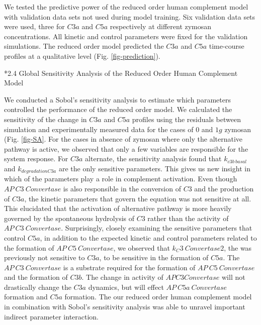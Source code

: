 \documentclass[12pt]{article}
\makeatletter
\renewcommand\subsection{\@startsection
	{subsection}{2}{0mm}
	{-0.05in}
	{-0.5\baselineskip}
	{\normalfont\normalsize\bfseries}}
\makeatother
\begin{document}
We tested the predictive power of the reduced order human complement model with validation data sets not used during model training. Six validation data sets were used, three for $C3a$ and $C5a$ respectively at different zymosan concentrations. All kinetic and control parameters were
fixed for the validation simulations. The reduced order model predicted the $C3a$ and $C5a$ time-course profiles at a qualitative level (Fig. \ref{fig-prediction}).

\subsection*{2.4 Global Sensitivity Analysis of the Reduced Order Human Complement Model}

We conducted a Sobol's sensitivity analysis to estimate which parameters controlled the performance of the reduced order model. We calculated the sensitivity of the change in $C3a$ and $C5a$ profiles using the residuals between simulation and experimentally measured data for the cases of $0$ and $1 g$ zymosan (Fig. \ref{fig-SA}. For the cases in absence of zymosan where only the alternative pathway is active, we observed that only a few variables are responsible for the system response. For $C3a$ alternate, the sensitivity analysis found that $k_{c3b~basal}$ and $k_{degradationC3a}$ are the only sensitive parameters. This gives us new insight in which of the parameters play a role in complement activation. Even though $AP~C3~Convertase$ is also responsible in the conversion of $C3$ and the production of $C3a$, the kinetic parameters that govern the equation was not sensitive at all. This elucidated that the activation of alternative pathway is more heavily governed by the spontaneous hydrolysis of $C3$ rather than the activity of $AP~C3~Convertase$. Surprisingly, closely examining the sensitive parameters that control $C5a$, in addition to the expected kinetic and control parameters related to the formation of $AP~C5~Convertase$, we observed that $k_C3~Convertase2$, the was previously not sensitive to $C3a$, to be sensitive in the formation of $C5a$. The $AP~C3~Convertase$ is a substrate required for the formation of $AP~C5~Convertase$ and the formation of $C3b$. The change in activity of $AP C3 Convertase$  will not drastically change the $C3a$ dynamics, but will effect $AP~C5a~Convertase$ formation and $C5a$ formation. The our reduced order human complement model in combination with Sobol's sensitivity analysis was able to unravel important indirect parameter interaction. 
\end{document}
